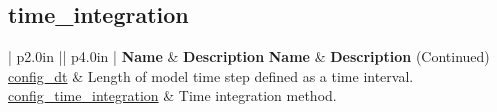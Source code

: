 \subsection[time\_integration]{time\_integration}
\label{subsec:forward_nm_tab_time_integration}

\vspace{0.5in}
{\small
\begin{center}
\begin{longtable}{| p{2.0in} || p{4.0in} |}
	\hline
	{\bf Name} & {\bf Description} \endfirsthead
	\hline 
	{\bf Name} & {\bf Description} (Continued) \endhead
	\hline
	\hline
	\hyperref[sec:nm_sec_config_dt]{config\_dt} & Length of model time step defined as a time interval. \\
	\hline
	\hyperref[sec:nm_sec_config_time_integration]{config\_time\_integration} & Time integration method. \\
	\hline
\end{longtable}
\end{center}
}
